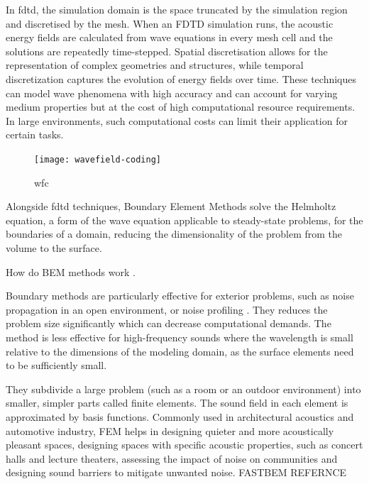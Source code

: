 In \acrshort{fdtd}, the simulation domain is the space truncated by the simulation region and discretised by the mesh. When an FDTD simulation runs, the acoustic energy fields are calculated from wave equations in every mesh cell and the solutions are repeatedly time-stepped. Spatial discretisation allows for the representation of complex geometries and structures, while temporal discretization captures the evolution of energy fields over time.
These techniques can model wave phenomena with high accuracy and can account for varying medium properties but at the cost of high computational resource requirements. In large environments, such computational costs can limit their application for certain tasks.


\begin{figure}[htbp]
    \centering
    \texttt{[image: wavefield-coding]}
    \caption[wave field coding]{wfc \citep{raghuvanshi2014parametric}}\label{fig:wavefield-coding}
\end{figure}










Alongside \acrshort{fdtd} techniques, Boundary Element Methods solve the Helmholtz equation, a form of the wave equation applicable to steady-state problems, for the boundaries of a domain, reducing the dimensionality of the problem from the volume to the surface.

How do BEM methods work \citep{gumerov2021fast}.

Boundary methods are particularly effective for exterior problems, such as noise propagation in an open environment, or noise profiling \citep{kirkup2019boundary}.
They reduces the problem size significantly which can decrease computational demands.
The method is less effective for high-frequency sounds where the wavelength is small relative to the dimensions of the modeling domain, as the surface elements need to be sufficiently small.



They subdivide a large problem (such as a room or an outdoor environment) into smaller, simpler parts called finite elements. The sound field in each element is approximated by basis functions. Commonly used in architectural acoustics and automotive industry, FEM helps in designing quieter and more acoustically pleasant spaces, designing spaces with specific acoustic properties, such as concert halls and lecture theaters, assessing the impact of noise on communities and designing sound barriers to mitigate unwanted noise. FASTBEM REFERNCE

